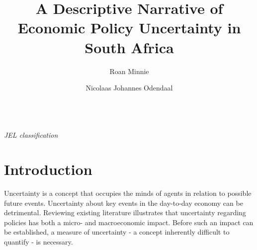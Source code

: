 \documentclass[11pt,preprint, authoryear]{elsarticle}
\numberwithin{equation}{section}
\numberwithin{figure}{section}
\numberwithin{table}{section}
\begin{document}
\begin{frontmatter}  %

\title{A Descriptive Narrative of Economic Policy Uncertainty in South Africa}





\author[Add1]{Roan Minnie}

\author[Add2]{Nicolaas Johannes Odendaal}




\address[Add1]{Stellenbosch University, Stellenbosch, South Africa}
\address[Add2]{Stellenbosch University, Stellenbosch, South Africa; Bureau of Economic
Research, South Africa}



\vspace{1cm}

\begin{keyword}
\footnotesize{
 \\ \vspace{0.3cm}
\textit{JEL classification} 
}
\end{keyword}
\vspace{0.5cm}
\end{frontmatter}



\pagestyle{fancy}
\chead{}
\rhead{}
\lfoot{}
\lhead{}
\cfoot{}


\headsep 35pt %




\section{\texorpdfstring{Introduction
\label{sec_intro}}{Introduction }}\label{introduction}

Uncertainty is a concept that occupies the minds of agents in relation
to possible future events. Uncertainty about key events in the
day-to-day economy can be detrimental. Reviewing existing literature
illustrates that uncertainty regarding policies has both a micro- and
macroeconomic impact. Before such an impact can be established, a measure of uncertainty - a concept inherently difficult to quantify - is necessary. 
\end{document}
